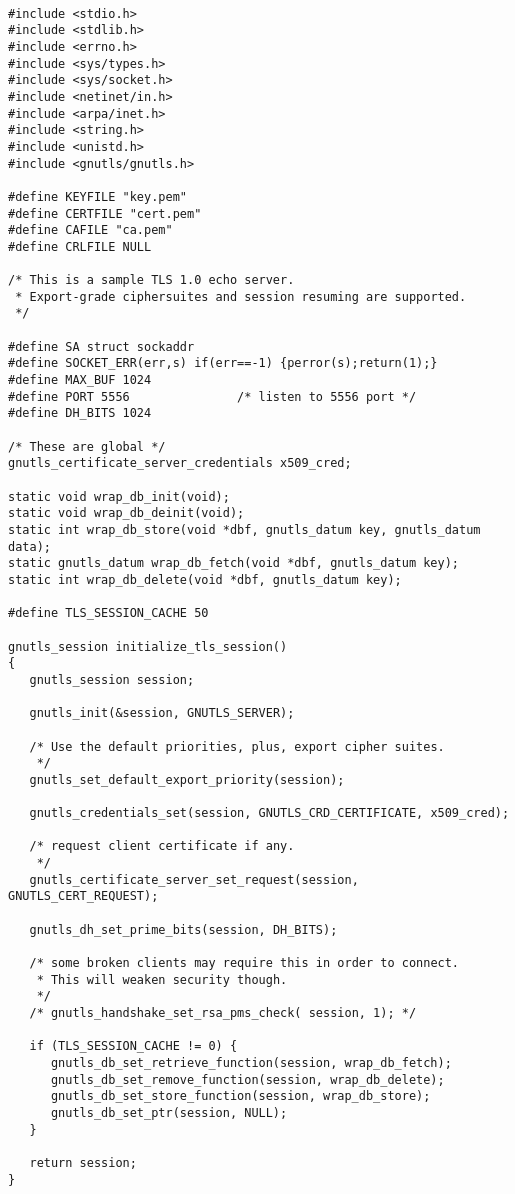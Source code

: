 \begin{verbatim}

#include <stdio.h>
#include <stdlib.h>
#include <errno.h>
#include <sys/types.h>
#include <sys/socket.h>
#include <netinet/in.h>
#include <arpa/inet.h>
#include <string.h>
#include <unistd.h>
#include <gnutls/gnutls.h>

#define KEYFILE "key.pem"
#define CERTFILE "cert.pem"
#define CAFILE "ca.pem"
#define CRLFILE NULL

/* This is a sample TLS 1.0 echo server.
 * Export-grade ciphersuites and session resuming are supported.
 */

#define SA struct sockaddr
#define SOCKET_ERR(err,s) if(err==-1) {perror(s);return(1);}
#define MAX_BUF 1024
#define PORT 5556               /* listen to 5556 port */
#define DH_BITS 1024

/* These are global */
gnutls_certificate_server_credentials x509_cred;

static void wrap_db_init(void);
static void wrap_db_deinit(void);
static int wrap_db_store(void *dbf, gnutls_datum key, gnutls_datum data);
static gnutls_datum wrap_db_fetch(void *dbf, gnutls_datum key);
static int wrap_db_delete(void *dbf, gnutls_datum key);

#define TLS_SESSION_CACHE 50

gnutls_session initialize_tls_session()
{
   gnutls_session session;

   gnutls_init(&session, GNUTLS_SERVER);

   /* Use the default priorities, plus, export cipher suites.
    */
   gnutls_set_default_export_priority(session);

   gnutls_credentials_set(session, GNUTLS_CRD_CERTIFICATE, x509_cred);

   /* request client certificate if any.
    */
   gnutls_certificate_server_set_request(session, GNUTLS_CERT_REQUEST);

   gnutls_dh_set_prime_bits(session, DH_BITS);

   /* some broken clients may require this in order to connect. 
    * This will weaken security though.
    */
   /* gnutls_handshake_set_rsa_pms_check( session, 1); */

   if (TLS_SESSION_CACHE != 0) {
      gnutls_db_set_retrieve_function(session, wrap_db_fetch);
      gnutls_db_set_remove_function(session, wrap_db_delete);
      gnutls_db_set_store_function(session, wrap_db_store);
      gnutls_db_set_ptr(session, NULL);
   }

   return session;
}


\end{verbatim}
